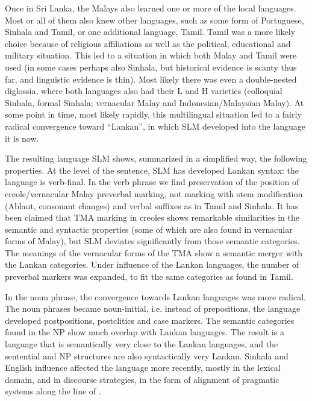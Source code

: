 Once in Sri Lanka, the Malays also learned one or more of the local languages. Most or all of them also knew other languages, such as some form of Portuguese, Sinhala and Tamil, or one additional language, Tamil. Tamil was a more likely choice because of religious affiliations as well as the political, educational and military situation. This led to a situation in which both Malay and Tamil were used (in some cases perhaps also Sinhala, but historical evidence is scanty thus far, and linguistic evidence is thin). Most likely there was even a double-nested diglossia, where both languages also had their L and H varieties (colloquial Sinhala, formal Sinhala; vernacular Malay and Indonesian/Malaysian Malay). At some point in time, most likely rapidly, this multilingual situation led to a fairly radical convergence toward ``Lankan'', in which SLM developed into the language it is now.

The resulting language SLM shows, summarized in a simplified way, the following properties. At the level of the sentence, SLM has developed Lankan syntax: the language is verb-final. In the verb phrase we find preservation of the position of creole/vernacular Malay preverbal marking, not marking with stem modification (Ablaut, consonant changes) and verbal suffixes as in Tamil and Sinhala. It has been claimed that TMA marking in creoles shows remarkable similarities in the semantic and syntactic properties (some of which are also found in vernacular forms of Malay), but SLM deviates significantly from those semantic categories. The meanings of the vernacular forms of the TMA show a semantic merger with the Lankan categories. Under influence of the Lankan languages, the number of preverbal markers was expanded, to fit the same categories as found in Tamil.


In the noun phrase, the convergence towards Lankan languages was more radical. The noun phrases became noun-initial, i.e. instead of prepositions, the language developed postpositions, postclitics and case markers. The semantic categories found in the NP show much overlap with Lankan languages.
The result is a language that is semantically very close to the Lankan languages, and the sentential and NP structures are also syntactically very Lankan. Sinhala and English influence affected the language more recently, mostly in the lexical domain, and in discourse strategies, in the form of alignment of pragmatic systems along the line of \citet{Matras2009}.


